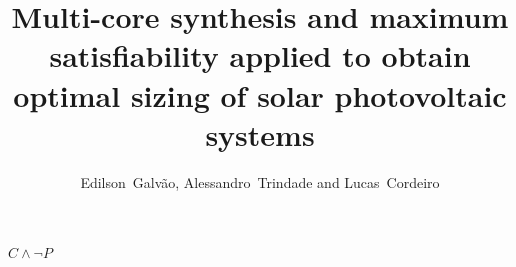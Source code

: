 \documentclass[journal,onecolumn]{IEEEtran}
\begin{document}
\title{Multi-core synthesis and maximum satisfiability applied to obtain optimal sizing of solar photovoltaic systems}
%
%
%

\author{Edilson~Galvão, Alessandro~Trindade and Lucas~Cordeiro}%
\maketitle

$C \wedge \neg P$

%
%
\end{document}
